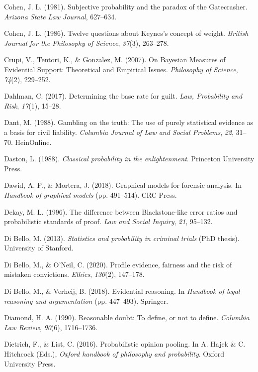 \documentclass[11pt,dvipsnames,enabledeprecatedfontcommands]{scrartcl}
\begin{document}
\hypertarget{ref-Cohen81}{}
Cohen, J. L. (1981). Subjective probability and the paradox of the
Gatecrasher. \emph{Arizona State Law Journal}, 627--634.

\hypertarget{ref-cohen86}{}
Cohen, J. L. (1986). Twelve questions about Keynes's concept of weight.
\emph{British Journal for the Philosophy of Science}, \emph{37}(3),
263--278.

\hypertarget{ref-crupi2007BayesianMeasuresEvidential}{}
Crupi, V., Tentori, K., \& Gonzalez, M. (2007). On Bayesian Measures of
Evidential Support: Theoretical and Empirical Issues. \emph{Philosophy
of Science}, \emph{74}(2), 229--252.

\hypertarget{ref-dahlman2017}{}
Dahlman, C. (2017). Determining the base rate for guilt. \emph{Law,
Probability and Risk}, \emph{17}(1), 15--28.

\hypertarget{ref-dant1988gambling}{}
Dant, M. (1988). Gambling on the truth: The use of purely statistical
evidence as a basis for civil liability. \emph{Columbia Journal of Law
and Social Problems}, \emph{22}, 31--70. HeinOnline.

\hypertarget{ref-daston1988}{}
Daston, L. (1988). \emph{Classical probability in the enlightenment}.
Princeton University Press.

\hypertarget{ref-dawid2018graphical}{}
Dawid, A. P., \& Mortera, J. (2018). Graphical models for forensic
analysis. In \emph{Handbook of graphical models} (pp. 491--514). CRC
Press.

\hypertarget{ref-Dekay1996}{}
Dekay, M. L. (1996). The difference between Blackstone-like error ratios
and probabilistic standards of proof. \emph{Law and Social Inquiry},
\emph{21}, 95--132.

\hypertarget{ref-di2013statistics}{}
Di Bello, M. (2013). \emph{Statistics and probability in criminal
trials} (PhD thesis). University of Stanford.

\hypertarget{ref-DiBelloONeil2020}{}
Di Bello, M., \& O'Neil, C. (2020). Profile evidence, fairness and the
risk of mistaken convictions. \emph{Ethics}, \emph{130}(2), 147--178.

\hypertarget{ref-di2018evidential}{}
Di Bello, M., \& Verheij, B. (2018). Evidential reasoning. In
\emph{Handbook of legal reasoning and argumentation} (pp. 447--493).
Springer.

\hypertarget{ref-diamond90}{}
Diamond, H. A. (1990). Reasonable doubt: To define, or not to define.
\emph{Columbia Law Review}, \emph{90}(6), 1716--1736.

\hypertarget{ref-Dietrich2016Probabilistic}{}
Dietrich, F., \& List, C. (2016). Probabilistic opinion pooling. In A.
Hajek \& C. Hitchcock (Eds.), \emph{Oxford handbook of philosophy and
probability}. Oxford University Press.
\end{document}
